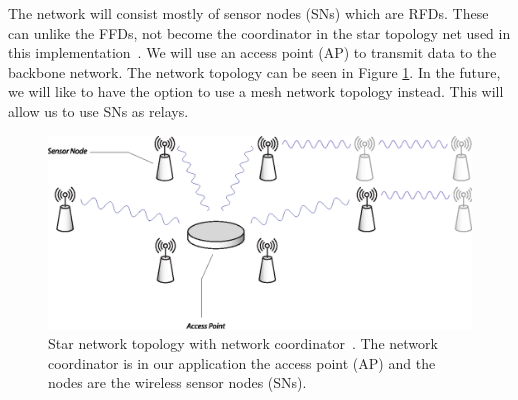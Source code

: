 The network will consist mostly of sensor nodes (SNs) which are RFDs. These can unlike the FFDs, not become the coordinator in the star topology net used in this implementation~\cite{zigbee, 802.15.4}. We will use an access point (AP) to transmit data to the backbone network. The network topology can be seen in Figure \ref{fig:network}. In the future, we will like to have the option to use a mesh network topology instead. This will allow us to use SNs as relays.

\begin{figure}[hbtp]
 \centering
 \begin{minipage}{1\linewidth}
  \includegraphics[width=1\linewidth]{images/network.eps}
 \caption[Mesh network topology]{Star network topology with network coordinator~\cite{802.15.4, zigbee}. The network coordinator is in our application the access point (AP) and the nodes are the wireless sensor nodes (SNs).}
 \label{fig:network}
 \end{minipage}
\end{figure}
 	
